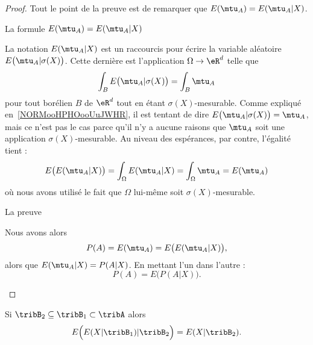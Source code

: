 \begin{proof}
    Tout le point de la preuve est de remarquer que \( E(\mtu_A)=E(\mtu_A|X)\).

    \begin{subproof}
    \item[La formule \( E(\mtu_A)=E(\mtu_A|X)\)]

     La notation \( E(\mtu_A|X)\) est un raccourcis pour écrire la variable aléatoire \( E\big(\mtu_A|\sigma(X)\big)\). Cette dernière est l'application \( \Omega\to \eR^d\) telle que
    \begin{equation}
        \int_B E\big( \mtu_A|\sigma(X) \big)=\int_B\mtu_A
    \end{equation}
    pour tout borélien \( B\) de \( \eR^d\) tout en étant \( \sigma(X)\)-mesurable. Comme expliqué en~\ref{NORMooHPHOooUuJWHR}, il est tentant de dire \( E\big( \mtu_A|\sigma(X) \big)=\mtu_A\), mais ce n'est pas le cas parce qu'il n'y a aucune raisons que \( \mtu_A\) soit une application \( \sigma(X)\)-mesurable. Au niveau des espérances, par contre, l'égalité tient :
    \begin{equation}
            E\big( E(\mtu_A|X) \big)=\int_{\Omega}E(\mtu_A|X)=\int_{\Omega}\mtu_A=E(\mtu_A)
    \end{equation}
    où nous avons utilisé le fait que \( \Omega\) lui-même soit \( \sigma(X)\)-mesurable.

        \item[La preuve]

            Nous avons alors
            \begin{equation}
                P(A)=E(\mtu_A)=E\big( E(\mtu_A|X) \big),
            \end{equation}
            alors que \( E(\mtu_A|X)=P(A|X)\). En mettant l'un dans l'autre :
            \begin{equation}
                P(A)=E\big( P(A|X) \big).
            \end{equation}
    \end{subproof}
\end{proof}

\begin{proposition}     \label{PropRGcscXj}
    Si \( \tribB_2\subseteq\tribB_1\subset\tribA\) alors
    \begin{equation}
        E\Big( E(X|\tribB_1)|\tribB_2 \Big)=E(X|\tribB_2).
    \end{equation}
\end{proposition}

